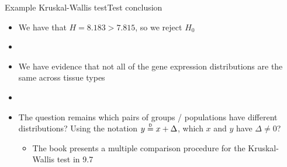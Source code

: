 \documentclass[xcolor=dvipsnames]{beamer}
\newcommand\myeq{\mathrel{\overset{\makebox[0pt]{\mbox{\normalfont\tiny\sffamily D}}}{=}}}
\begin{document}
\begin{frame}{Example Kruskal-Wallis test}{Test conclusion}
	\begin{itemize}
		\item We have that $H = 8.183 > 7.815$, so we reject $H_0$
		\item[]
		\item We have evidence that not all of the gene expression distributions are the same across tissue types
		\item[]
		\item The question remains which pairs of groups / populations have different distributions? Using the notation $y \myeq x + \Delta$, which $x$ and $y$ have $\Delta \neq 0$?
		\begin{itemize}
			\item The book presents a multiple comparison procedure for the Kruskal-Wallis test in 9.7
		\end{itemize}
	\end{itemize}
\end{frame}
\end{document}
